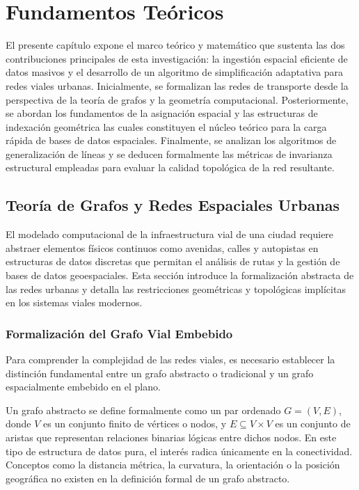 \chapter{Fundamentos Teóricos}

El presente capítulo expone el marco teórico y matemático que sustenta las dos contribuciones principales de esta investigación: la ingestión espacial eficiente de datos masivos y el desarrollo de un algoritmo de simplificación adaptativa para redes viales urbanas. Inicialmente, se formalizan las redes de transporte desde la perspectiva de la teoría de grafos y la geometría computacional. Posteriormente, se abordan los fundamentos de la asignación espacial y las estructuras de indexación geométrica las cuales constituyen el núcleo teórico para la carga rápida de bases de datos espaciales. Finalmente, se analizan los algoritmos de generalización de líneas y se deducen formalmente las métricas de invarianza estructural empleadas para evaluar la calidad topológica de la red resultante.

\section{Teoría de Grafos y Redes Espaciales Urbanas}

El modelado computacional de la infraestructura vial de una ciudad requiere abstraer elementos físicos continuos como avenidas, calles y autopistas en estructuras de datos discretas que permitan el análisis de rutas y la gestión de bases de datos geoespaciales. Esta sección introduce la formalización abstracta de las redes urbanas y detalla las restricciones geométricas y topológicas implícitas en los sistemas viales modernos.

\subsection{Formalización del Grafo Vial Embebido}

Para comprender la complejidad de las redes viales, es necesario establecer la distinción fundamental entre un grafo abstracto o tradicional y un grafo espacialmente embebido en el plano.

Un grafo abstracto se define formalmente como un par ordenado $G = (V, E)$, donde $V$ es un conjunto finito de vértices o nodos, y $E \subseteq V \times V$ es un conjunto de aristas que representan relaciones binarias lógicas entre dichos nodos. En este tipo de estructura de datos pura, el interés radica únicamente en la conectividad. Conceptos como la distancia métrica, la curvatura, la orientación o la posición geográfica no existen en la definición formal de un grafo abstracto.

